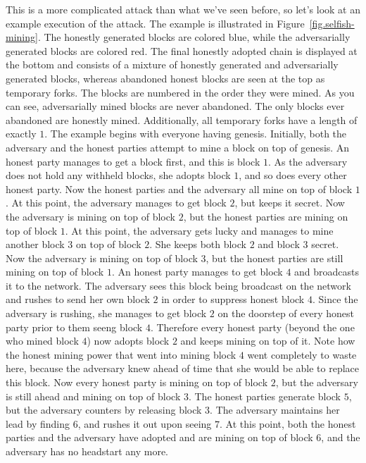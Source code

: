 This is a more complicated attack than what we've seen before, so let's look at an example
execution of the attack. The example is illustrated in Figure~\ref{fig.selfish-mining}. The
honestly generated blocks are colored blue, while the adversarially generated blocks are
colored red. The final honestly adopted chain is displayed at the bottom and consists of a
mixture of honestly generated and adversarially generated blocks, whereas abandoned honest
blocks are seen at the top as temporary forks. The blocks are numbered in the order they were
mined. As you can see, adversarially mined blocks are never abandoned. The only blocks ever
abandoned are honestly mined. Additionally, all temporary forks have a length of exactly $1$.
The example begins with everyone having genesis. Initially, both the adversary and the honest
parties attempt to mine a block on top of genesis. An honest party manages to get a block first,
and this is block $1$. As the adversary does not hold any withheld blocks, she adopts block
$1$, and so does every other honest party. Now the honest parties and the adversary all mine
on top of block $1$. At this point, the adversary manages to get block $2$, but keeps it secret.
Now the adversary is mining on top of block $2$, but the honest parties are mining on top of
block $1$. At this point, the adversary gets lucky and manages to mine another block $3$
on top of block $2$. She keeps both block $2$ and block $3$ secret. Now the adversary is mining
on top of block $3$, but the honest parties are still mining on top of block $1$. An honest
party manages to get block $4$ and broadcasts it to the network. The adversary
sees this block being broadcast on the network and rushes to send her own block $2$ in order to
suppress honest block $4$. Since the adversary is rushing, she manages to get block $2$ on
the doorstep of every honest party prior to them seeng block $4$. Therefore every honest
party (beyond the one who mined block $4$) now adopts block $2$ and keeps mining on top of it.
Note how the honest mining power that went into mining block $4$ went completely to waste
here, because the adversary knew ahead of time that she would be able to replace this block.
Now every honest party is mining on top of block $2$, but the adversary is still ahead and
mining on top of block $3$. The honest parties generate block $5$, but the adversary counters
by releasing block $3$. The adversary maintains her lead by finding $6$, and rushes it out upon
seeing $7$. At this point, both the honest parties and the adversary have adopted and are mining
on top of block $6$, and the adversary has no headstart any more.


